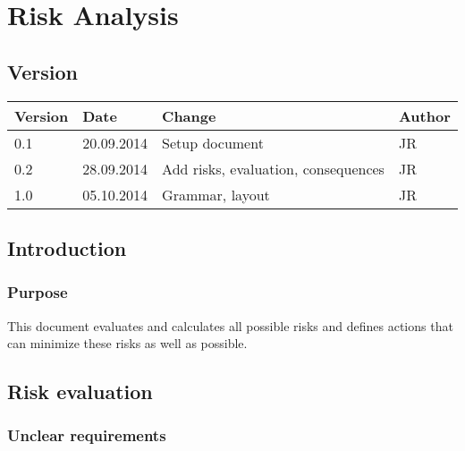
\chapter{Risk Analysis} %

\label{ChapterX} %



\section{Version}

\begin{tabular}{| p{1.5cm} | p{2cm} | p{9cm} | p{1.5cm} |}
	\hline
	Version & Date 		& Change & Author \\ \hline
	0.1 	& 20.09.2014 		& Setup document  										& JR \\ \hline
	0.2 	& 28.09.2014		& Add risks, evaluation, consequences					& JR \\ \hline
	1.0 	& 05.10.2014		& Grammar, layout 										& JR \\ \hline

\end{tabular}

\section{Introduction}

\subsection{Purpose}

This document evaluates and calculates all possible risks and defines actions that can minimize these risks as well as possible.

\section{Risk evaluation}

\subsection{Unclear requirements}

